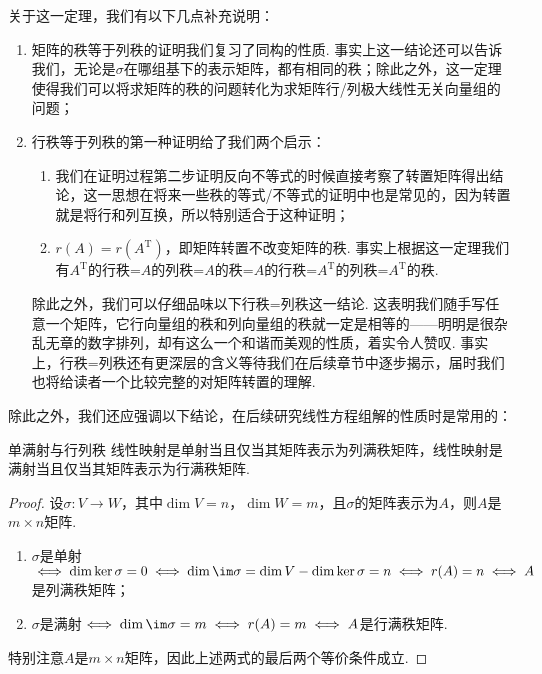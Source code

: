关于这一定理，我们有以下几点补充说明：
\begin{enumerate}
    \item 矩阵的秩等于列秩的证明我们复习了同构的性质. 事实上这一结论还可以告诉我们，无论是$\sigma$在哪组基下的表示矩阵，都有相同的秩；除此之外，这一定理使得我们可以将求矩阵的秩的问题转化为求矩阵行/列极大线性无关向量组的问题；

    \item 行秩等于列秩的第一种证明给了我们两个启示：
          \begin{enumerate}
              \item 我们在证明过程第二步证明反向不等式的时候直接考察了转置矩阵得出结论，这一思想在将来一些秩的等式/不等式的证明中也是常见的，因为转置就是将行和列互换，所以特别适合于这种证明；

              \item $r(A)=r(A^\mathrm{T})$，即矩阵转置不改变矩阵的秩. 事实上根据这一定理我们有$A^\mathrm{T}$的行秩=$A$的列秩=$A$的秩=$A$的行秩=$A^\mathrm{T}$的列秩=$A^\mathrm{T}$的秩.
          \end{enumerate}
          除此之外，我们可以仔细品味以下行秩=列秩这一结论. 这表明我们随手写任意一个矩阵，它行向量组的秩和列向量组的秩就一定是相等的——明明是很杂乱无章的数字排列，却有这么一个和谐而美观的性质，着实令人赞叹. 事实上，行秩=列秩还有更深层的含义等待我们在后续章节中逐步揭示，届时我们也将给读者一个比较完整的对矩阵转置的理解.
\end{enumerate}

除此之外，我们还应强调以下结论，在后续研究线性方程组解的性质时是常用的：
\begin{theorem}{}{单满射与行列秩}
    线性映射是单射当且仅当其矩阵表示为列满秩矩阵，线性映射是满射当且仅当其矩阵表示为行满秩矩阵.
\end{theorem}

\begin{proof}
    设$\sigma:V\to W$，其中$\dim V=n$，$\dim W=m$，且$\sigma$的矩阵表示为$A$，则$A$是$m\times n$矩阵.
    \begin{enumerate}
        \item $\sigma$是单射$\iff\dim\ker\sigma=0\iff \dim\im\sigma=\dim V-\dim\ker\sigma=n\iff r(A)=n\iff A$是列满秩矩阵；

        \item $\sigma$是满射$\iff\dim\im\sigma=m\iff r(A)=m\iff A$是行满秩矩阵.
    \end{enumerate}
    特别注意$A$是$m\times n$矩阵，因此上述两式的最后两个等价条件成立.
\end{proof}


